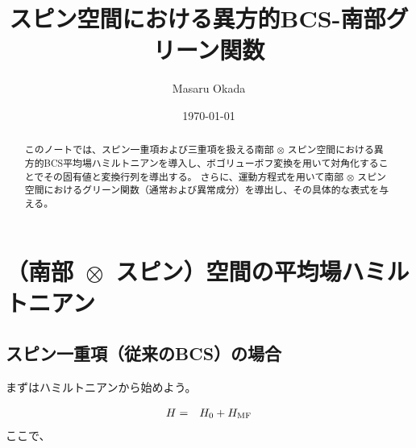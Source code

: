 \documentclass[uplatex,a4j,12pt,dvipdfmx]{jsarticle}
\title{
スピン空間における異方的BCS-南部グリーン関数
}
\author{Masaru Okada}
\date{\today}
\begin{document}
\maketitle

\begin{abstract}
	このノートでは、スピン一重項および三重項を扱える南部 $\otimes$ スピン空間における異方的BCS平均場ハミルトニアンを導入し、ボゴリューボフ変換を用いて対角化することでその固有値と変換行列を導出する。
	さらに、運動方程式を用いて南部 $\otimes$ スピン空間におけるグリーン関数（通常および異常成分）を導出し、その具体的な表式を与える。
\end{abstract}

\tableofcontents

\section{（南部 $\!\! \otimes \!\!$ スピン）空間の平均場ハミルトニアン}

\subsection{スピン一重項（従来のBCS）の場合}

まずはハミルトニアンから始めよう。

\begin{eqnarray}
	H
	&=&
	H_{0}
	+
	H_{\rm MF}
\end{eqnarray}
%
ここで、
\end{document}
